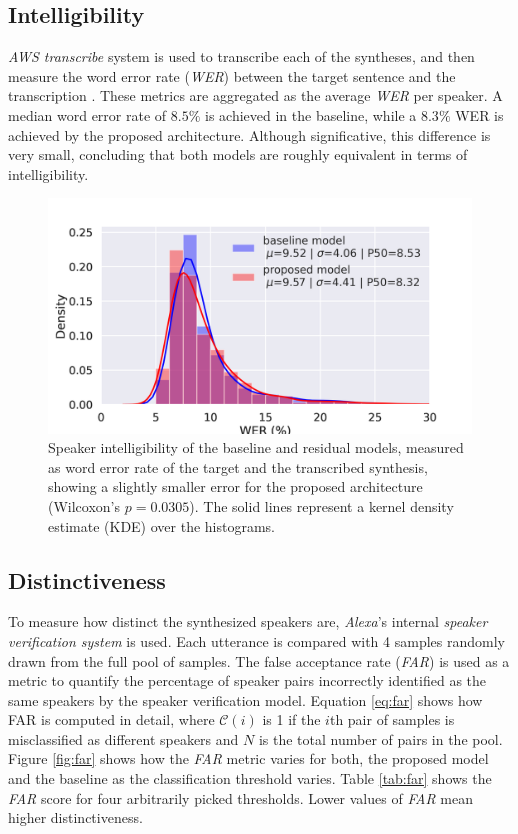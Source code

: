 \subsection{Intelligibility}
\textit{AWS transcribe} system is used to transcribe each of the syntheses, and then measure the word error rate (\textit{WER}) between the target sentence and the transcription \autocite{uday2019}. These metrics are aggregated as the average \textit{WER} per speaker. A median word error rate of $8.5\%$ is achieved in the baseline, while a $8.3\%$ WER is achieved by the proposed architecture. Although significative, this difference is very small, concluding that both models are roughly equivalent in terms of intelligibility.


\begin{figure}[h]
	\centering
	\includegraphics[width=0.7\linewidth]{tts/images/wer}
	\caption{Speaker intelligibility of the baseline and residual models, measured as word error rate of the target and the transcribed synthesis, showing a slightly smaller error for the proposed architecture (Wilcoxon's $p=0.0305$). The solid lines represent a kernel density estimate (KDE) over the histograms.}
	\label{fig:wer}
\end{figure}


\subsection{Distinctiveness}
To measure how distinct the synthesized speakers are, \textit{Alexa}'s internal \textit{speaker verification system} is used.  Each utterance is compared with 4 samples randomly drawn from the full pool of samples. The false acceptance rate (\textit{FAR}) is used as a metric to quantify the percentage of speaker pairs incorrectly identified as the same speakers by the speaker verification model. Equation \ref{eq:far} shows how FAR is computed in detail, where $\mathcal{C}(i)$ is 1 if the $i$th pair of samples is misclassified as different speakers and $N$ is the total number of pairs in the pool. Figure \ref{fig:far} shows how the \textit{FAR} metric varies for both, the proposed model and the baseline as the classification threshold varies. Table \ref{tab:far} shows the \textit{FAR} score for four arbitrarily picked thresholds. Lower values of \textit{FAR} mean higher distinctiveness.

